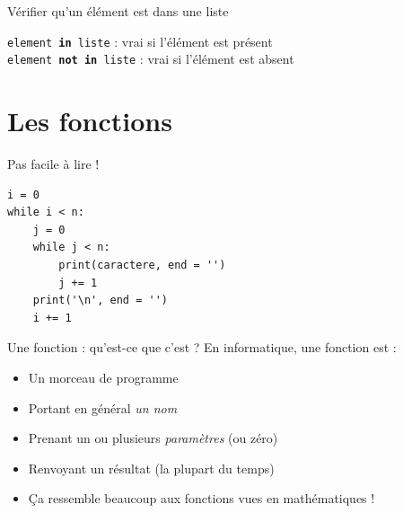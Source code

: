 \documentclass{beamer}
\begin{document}
\begin{frame}[fragile]{Vérifier qu'un élément est dans une liste}
	\begin{center}
		\texttt{element \textbf{in} liste} : vrai si l'élément est présent\\
		\texttt{element \textbf{not in} liste} : vrai si l'élément est absent
	\end{center}

\end{frame}

\section{Les fonctions}

\begin{frame}[fragile]{Pas facile à lire !}

\begin{verbatim}
i = 0
while i < n:
    j = 0
    while j < n:
        print(caractere, end = '')
        j += 1
    print('\n', end = '')
    i += 1
\end{verbatim}
\end{frame}

\begin{frame}{Une fonction : qu'est-ce que c'est ?}
    En informatique, une fonction est :
    \begin{itemize}
    \item Un morceau de programme
    \item Portant en général \emph{un nom}
    \item Prenant un ou plusieurs \emph{paramètres} (ou zéro)
    \item Renvoyant un résultat (la plupart du temps)
    \item[\MVRightarrow{}] Ça ressemble beaucoup aux fonctions vues en mathématiques !
    \end{itemize}
\end{frame}
\end{document}
